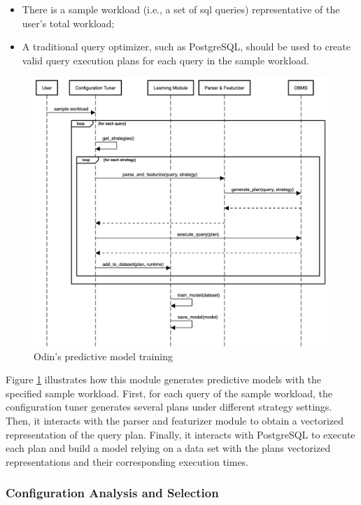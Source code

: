\begin{itemize}
    \item There is a sample workload (i.e., a set of \gls{sql} queries) representative of the user's total workload;
    \item A traditional query optimizer, such as PostgreSQL, should be used to create valid query execution plans for each query in the sample workload.
\end{itemize}

\begin{figure}[H]
\centering
\includegraphics[width=\textwidth]{img/solution/training_sequence_diagram.png}
\caption{Odin's predictive model training}
\label{fig:training_sequence_diagram}
\end{figure}

Figure \ref{fig:training_sequence_diagram} illustrates how this module generates predictive models with the specified sample workload. First, for each query of the sample workload, the configuration tuner generates several plans under different strategy settings. Then, it interacts with the parser and featurizer module to obtain a vectorized representation of the query plan. Finally, it interacts with PostgreSQL to execute each plan and build a model relying on a data set with the plans vectorized representations and their corresponding execution times.

\subsubsection{Configuration Analysis and Selection}

